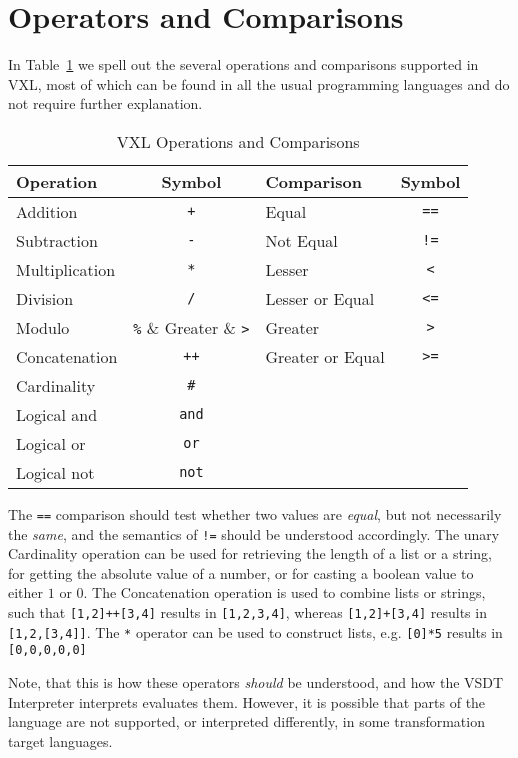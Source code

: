 
\section{Operators and Comparisons}

In Table~\ref{tab:vxl_op} we spell out the several operations and comparisons
supported in VXL, most of which can be found in all the usual programming languages
and do not require further explanation.

\begin{table}[htbp]
\centering
	\caption{VXL Operations and Comparisons}
	\begin{tabular}{lc||lc}
		\hline
		\bf Operation   & \bf Symbol & \bf Comparison   & \bf Symbol \\
		\hline
		Addition        & \verb_+_	 & Equal            & \verb_==_  \\
		Subtraction     & \verb_-_	 & Not Equal        & \verb_!=_  \\
		Multiplication  & \verb_*_   & Lesser           & \verb_<_   \\
		Division        & \verb_/_   & Lesser or Equal  & \verb_<=_  \\
		Modulo          & \verb_%_   & Greater          & \verb_>_   \\
		Concatenation   & \verb_++_  & Greater or Equal & \verb_>=_  \\
		Cardinality     & \verb_#_   &                  &            \\
		Logical \sc and & \verb_and_ &                  &            \\
		Logical \sc or  & \verb_or_  &                  &            \\
		Logical \sc not & \verb_not_ &                  &            \\
		\hline
	\end{tabular}
	\label{tab:vxl_op}
\end{table}

The \verb_==_ comparison should test whether two values are \emph{equal}, but not
necessarily the \emph{same}, and the semantics of \verb_!=_ should be understood
accordingly.  The unary Cardinality operation can be used for retrieving the length
of a list or a string, for getting the absolute value of a number, or for casting
a boolean value to either $1$ or $0$.  The Concatenation operation is used to
combine lists or strings, such that \verb_[1,2]++[3,4]_ results in \verb_[1,2,3,4]_,
whereas \verb_[1,2]+[3,4]_ results in \verb_[1,2,[3,4]]_.  The \verb_*_ operator
can be used to construct lists, e.g. \verb_[0]*5_ results in \verb_[0,0,0,0,0]_

Note, that this is how these operators \emph{should} be understood, and how the
VSDT Interpreter interprets evaluates them.  However, it is possible that parts
of the language are not supported, or interpreted differently, in some transformation
target languages.

